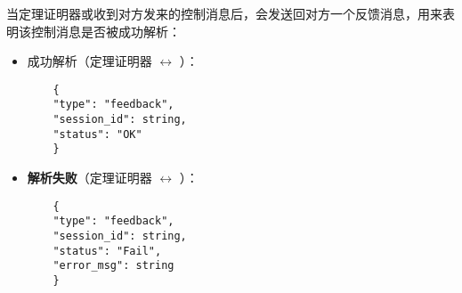 当定理证明器或收到对方发来的控制消息后，会发送回对方一个反馈消息，用来表明该控制消息是否被成功解析：
\begin{itemize}
	\item \textsf{成功解析}（定理证明器 $\longleftrightarrow$ ）：
	\begin{verbatim}
	{
	"type": "feedback",
	"session_id": string,
	"status": "OK"
	}
	\end{verbatim}
	\item \textbf{解析失败}（定理证明器 $\longleftrightarrow$ ）：
	\begin{verbatim}
	{
	"type": "feedback",
	"session_id": string,
	"status": "Fail",
	"error_msg": string
	}
	\end{verbatim}
\end{itemize}

